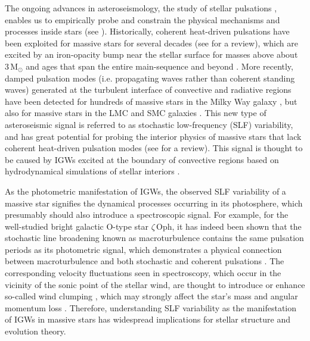 \documentclass[fleqn,usenatbib]{mnras}
\begin{document}
The ongoing advances in asteroseismology, the study of stellar pulsations \citep{Aerts2010_book}, enables us to empirically probe and constrain the physical mechanisms and processes inside stars (see \citealt{Aerts2021_review}). Historically, coherent heat-driven pulsations have been exploited for massive stars for several decades (see \citealt{Bowman_2020_review} for a review), which are excited by an iron-opacity bump near the stellar surface for masses above about 3\,M$_{\odot}$ and ages that span the entire main-sequence and beyond \citep{DziembowskiPamyatnykh1993, Miglio+2007, Burssens+2020}. More recently, damped pulsation modes (i.e. propagating waves rather than coherent standing waves) generated at the turbulent interface of convective and radiative regions have been detected for hundreds of massive stars in the Milky Way galaxy \citep{ Bowman+2019_nat, Bowman+2019_corot, Bowman+2020aa}, but also for massive stars in the LMC and SMC galaxies \citep{Bowman+2019_nat, BowmanVanDaele2024}. This new type of asteroseismic signal is referred to as stochastic low-frequency (SLF) variability, and has great potential for probing the interior physics of massive stars that lack coherent heat-driven pulsation modes (see \citealt{Bowman2023} for a review). This signal is thought to be caused by IGWs excited at the boundary of convective regions based on hydrodynamical simulations of stellar interiors \citep{Rogers2013, AertsRogers2015, Rogers+2017, Edelmann+2019ApJ, Schultz2022a, Anders+2023, Thompson+2024_3Dsim}.

As the photometric manifestation of IGWs, the observed SLF variability of a massive star signifies the dynamical processes occurring in its photosphere, which presumably should also introduce a spectroscopic signal. For example, for the well-studied bright galactic O-type star $\zeta\,$Oph, it has indeed been shown that the stochastic line broadening known as macroturbulence \citep{SimonDiaz+2017} contains the same pulsation periods as its photometric signal, which demonstrates a physical connection between macroturbulence and both stochastic and coherent pulsations \citep{Kalita+2025}. The corresponding velocity fluctuations seen in spectroscopy, which occur in the vicinity of the sonic point of the stellar wind, are thought to introduce or enhance so-called wind clumping \citep{Cantiello+2009,Debnath+2024}, which may strongly affect the star's mass and angular momentum loss \citep{Langer1998,Muijres+2011}. Therefore, understanding SLF variability as the manifestation of IGWs in massive stars has widespread implications for stellar structure and evolution theory.
\end{document}
